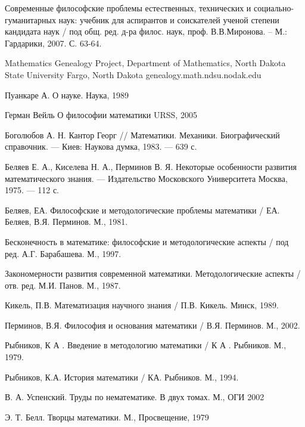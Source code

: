 \documentclass[a4paper,14pt]{extreport}
\begin{document}
\begin{thebibliography}{9}

Современные философские проблемы естественных, технических и социально- гуманитарных наук: учебник для аспирантов и соискателей ученой степени кандидата наук / под общ. ред. д-ра филос. наук, проф. В.В.Миронова. – М.: Гардарики, 2007. С. 63-64.

Mathematics Genealogy Project,
Department of Mathematics, North Dakota State University
Fargo, North Dakota
genealogy.math.ndsu.nodak.edu

Пуанкаре А.
О науке.
Наука, 1989

Герман Вейль
О философии математики
URSS, 2005

Боголюбов А. Н. Кантор Георг // Математики. Механики. Биографический справочник. — Киев: Наукова думка, 1983. — 639 с.

Беляев Е. А., Киселева Н. А., Перминов В. Я. Некоторые особенности развития математического знания. — Издательство Московского Университета Москва, 1975. — 112 с.

Беляев, ЕА. Философские и методологические проблемы математики / ЕА. Беляев, В.Я. Перминов. М., 1981.

Бесконечность в математике: философские и методологические аспекты / под ред. А.Г. Барабашева. М., 1997.

Закономерности развития современной математики. Методологические аспекты / отв. ред. М.И. Панов. М., 1987.

Кикель, П.В. Математизация научного знания / П.В. Кикель. Минск, 1989.

Перминов, В.Я. Философия и основания математики / В.Я. Перминов. М., 2002.

Рыбников, К А . Введение в методологию математики / К А . Рыбников. М.,
1979.

Рыбников, К.А. История математики / КА. Рыбников. М., 1994.

В. А. Успенский. Труды по нематематике. В двух томах. М., ОГИ 2002

Э. Т. Белл. Творцы математики. М., Просвещение, 1979

\end{thebibliography}
\end{document}
